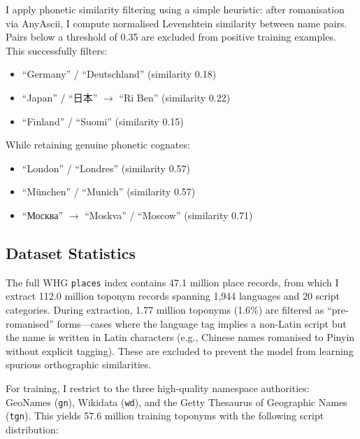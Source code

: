 \documentclass[11pt,a4paper]{article}
\newcommand{\textcn}[1]{{\chinesefont #1}}
\begin{document}
I apply phonetic similarity filtering using a simple heuristic: after romanisation via AnyAscii, I compute normalised Levenshtein similarity between name pairs. Pairs below a threshold of 0.35 are excluded from positive training examples. This successfully filters:

\begin{itemize}
    \item ``Germany'' / ``Deutschland'' (similarity 0.18)
    \item ``Japan'' / ``\textcn{日本}'' $\rightarrow$ ``Ri Ben'' (similarity 0.22)
    \item ``Finland'' / ``Suomi'' (similarity 0.15)
\end{itemize}

While retaining genuine phonetic cognates:

\begin{itemize}
    \item ``London'' / ``Londres'' (similarity 0.57)
    \item ``München'' / ``Munich'' (similarity 0.57)
    \item ``Москва'' $\rightarrow$ ``Moskva'' / ``Moscow'' (similarity 0.71)
\end{itemize}

\subsection{Dataset Statistics}

The full WHG \texttt{places} index contains 47.1 million place records, from which I extract 112.0 million toponym records spanning 1,944 languages and 20 script categories. During extraction, 1.77 million toponyms (1.6\%) are filtered as ``pre-romanised'' forms---cases where the language tag implies a non-Latin script but the name is written in Latin characters (e.g., Chinese names romanised to Pinyin without explicit tagging). These are excluded to prevent the model from learning spurious orthographic similarities.

For training, I restrict to the three high-quality namespace authorities: GeoNames (\texttt{gn}), Wikidata (\texttt{wd}), and the Getty Thesaurus of Geographic Names (\texttt{tgn}). This yields 57.6 million training toponyms with the following script distribution:
\end{document}

